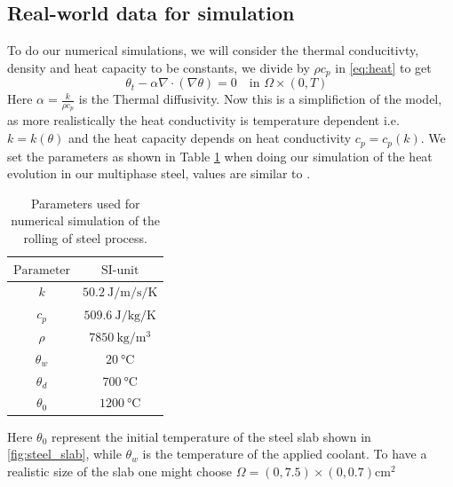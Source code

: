 \subsection{Real-world data for simulation}

To do our numerical simulations, we will consider the thermal conducitivty, density and heat capacity to be constants, we divide by $\rho c_p$ in \eqref{eq:heat} to get 
\begin{equation*}
    \theta_t - \alpha \nabla \cdot (\nabla \theta) = 0 \quad \text{in $\Omega \times (0,T)$ }
\end{equation*}
Here $\alpha = \frac{k}{\rho c_p}$ is the Thermal diffusivity. Now this is a simplifiction of the model, as more realistically the heat conductivity is temperature dependent i.e. $k = k(\theta)$ and the heat capacity depends on heat conductivity $c_p = c_p(k)$. We set the parameters as shown in Table \ref{tab:chosenParam} when doing our simulation of the heat evolution in our multiphase steel, values are similar to \cite{DPSteel}. 


\begin{table}[h]
    \centering
    \caption{Parameters used for numerical simulation of the rolling of steel process.}
    \begin{tabular}{c|c}
    $\text{Parameter}$ & $\text{SI-unit}$ \\
    \hline
       $k$& $\SI{50.2}{\joule\per\metre\per\second\per\kelvin}$ \\
        $c_p$ & $\SI{509.6}{\joule\per\kilogram\per\kelvin}$ \\
        $\rho$ & $\SI{7850}{\kilogram\per\metre\cubed}$ \\
        $\theta_w$ & $\SI{20}{\celsius}$ \\
        $\theta_d$ & $\SI{700}{\celsius}$ \\
        $\theta_0$ & $\SI{1200}{\celsius}$ \\
    \end{tabular}
    \label{tab:chosenParam}
\end{table}
Here $\theta_0$ represent the initial temperature of the steel slab shown in \ref{fig:steel_slab}, while $\theta_w$ is the temperature of the applied coolant. To have a realistic size of the slab one might choose $\Omega = (0,7.5)\times(0,0.7) \text{cm}^2$

